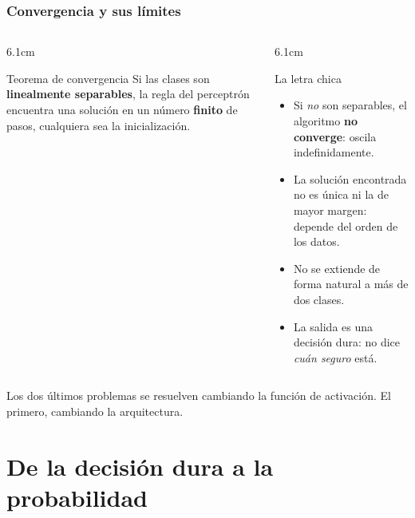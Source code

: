 \documentclass[aspectratio=169, 10pt]{beamer}
\begin{document}
\begin{frame}
\frametitle{Convergencia y sus límites}
\begin{columns}[T]
\begin{column}{6.1cm}
\begin{exampleblock}{Teorema de convergencia}
Si las clases son \textbf{linealmente separables}, la regla del perceptr\'on encuentra una soluci\'on en un n\'umero \textbf{finito} de pasos, cualquiera sea la inicializaci\'on.
\end{exampleblock}
\end{column}
\begin{column}{6.1cm}
\begin{alertblock}{La letra chica}
\begin{itemize}
	\item Si \emph{no} son separables, el algoritmo \textbf{no converge}: oscila indefinidamente.
	\item La soluci\'on encontrada no es \'unica ni la de mayor margen: depende del orden de los datos.
	\item No se extiende de forma natural a m\'as de dos clases.
	\item La salida es una decisi\'on dura: no dice \emph{cu\'an seguro} est\'a.
\end{itemize}
\end{alertblock}
\end{column}
\end{columns}
\vspace{0.4em}
\footnotesize
Los dos \'ultimos problemas se resuelven cambiando la funci\'on de activaci\'on. El primero, cambiando la arquitectura.
\end{frame}

\section{De la decisión dura a la probabilidad}
\end{document}
